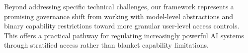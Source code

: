 \documentclass{article}
\theoremstyle{plain}
\theoremstyle{definition}
\theoremstyle{remark}
\begin{document}
Beyond addressing specific technical challenges, our framework
represents a promising governance shift from working with model-level
abstractions and binary capability restrictions toward more granular
user-level access controls. This offers a practical pathway for
regulating increasingly powerful AI systems through stratified access
rather than blanket capability limitations.




\newpage
\appendix
\onecolumn
\end{document}
